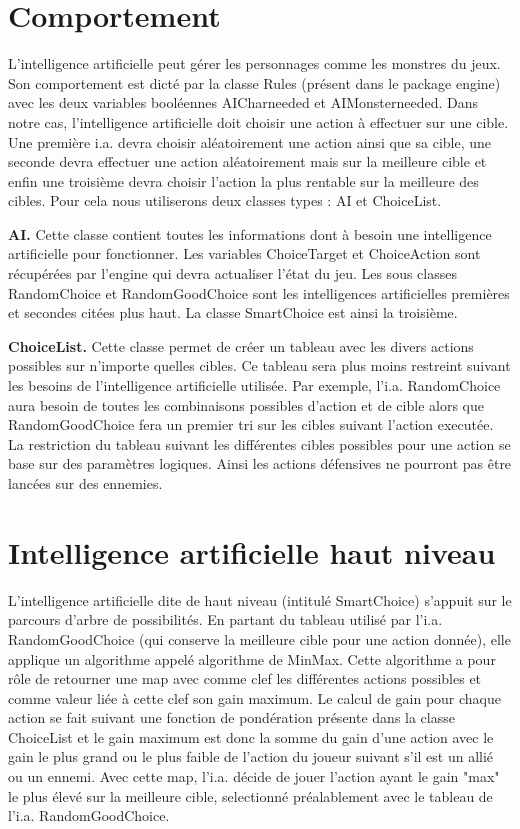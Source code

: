 \documentclass[12pt,a4paper]{report}
\begin{document}
\section{Comportement}

L'intelligence artificielle peut g\'{e}rer les personnages comme les monstres du jeux. Son comportement est dict\'{e} par la classe Rules (pr\'{e}sent dans le package engine) avec les deux variables bool\'{e}ennes AICharneeded et AIMonsterneeded.
Dans notre cas, l'intelligence artificielle doit choisir une action \`{a} effectuer sur une cible. Une premi\`{e}re i.a. devra choisir al\'{e}atoirement une action ainsi que sa cible, une seconde devra effectuer une action al\'{e}atoirement mais sur la meilleure cible et enfin une troisi\`{e}me devra choisir l'action la plus rentable sur la meilleure des cibles.
Pour cela nous utiliserons deux classes types : AI et ChoiceList.

\textbf{AI.} Cette classe contient toutes les informations dont \`{a} besoin une intelligence artificielle pour fonctionner. Les variables ChoiceTarget et ChoiceAction sont r\'{e}cup\'{e}r\'{e}es par l'engine qui devra actualiser l'\'{e}tat du jeu. Les sous classes RandomChoice et RandomGoodChoice sont les intelligences artificielles premi\`{e}res et secondes cit\'{e}es plus haut. La classe SmartChoice est ainsi la troisi\`{e}me.

\textbf{ChoiceList.} Cette classe permet de cr\'{e}er un tableau avec les divers actions possibles sur n'importe quelles cibles. Ce tableau sera plus moins restreint suivant les besoins de l'intelligence artificielle utilis\'{e}e. Par exemple, l'i.a. RandomChoice aura besoin de toutes les combinaisons possibles d'action et de cible alors que RandomGoodChoice fera un premier tri sur les cibles suivant l'action execut\'{e}e. La restriction du tableau suivant les diff\'{e}rentes cibles possibles pour une action se base sur des paramètres logiques. Ainsi les actions d\'{e}fensives ne pourront pas \^{e}tre lanc\'{e}es sur des ennemies.

\section{Intelligence artificielle haut niveau}

L'intelligence artificielle dite de haut niveau (intitul\'{e} SmartChoice) s'appuit sur le parcours d'arbre de possibilit\'{e}s. En partant du tableau utilis\'{e} par l'i.a. RandomGoodChoice (qui conserve la meilleure cible pour une action donn\'{e}e), elle applique un algorithme appel\'{e} algorithme de MinMax. Cette algorithme a pour r\^{o}le de retourner une map avec comme clef les diff\'{e}rentes actions possibles et comme valeur li\'{e}e \`{a} cette clef son gain maximum. Le calcul de gain pour chaque action se fait suivant une fonction de pond\'{e}ration pr\'{e}sente dans la classe ChoiceList et le gain maximum est donc la somme du gain d'une action avec le gain le plus grand ou le plus faible de l'action du joueur suivant s'il est un alli\'{e} ou un ennemi. Avec cette map, l'i.a. d\'{e}cide de jouer l'action ayant le gain "max" le plus \'{e}lev\'{e} sur la meilleure cible, selectionn\'{e} pr\'{e}alablement avec le tableau de l'i.a. RandomGoodChoice. 
\end{document}
